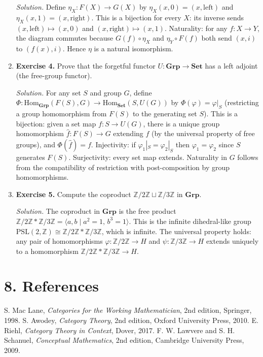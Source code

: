 \begin{enumerate}[leftmargin=*,itemsep=0.9em]
\emph{Solution.} Define $\eta_X:F(X)\to G(X)$ by $\eta_X(x,0)=(x,\text{left})$ and $\eta_X(x,1)=(x,\text{right})$. This is a bijection for every $X$: its inverse sends $(x,\text{left})\mapsto(x,0)$ and $(x,\text{right})\mapsto(x,1)$. Naturality: for any $f:X\to Y$, the diagram commutes because $G(f)\circ\eta_X$ and $\eta_Y\circ F(f)$ both send $(x,i)$ to $(f(x),i)$. Hence $\eta$ is a natural isomorphism.

\item \textbf{Exercise 4.} Prove that the forgetful functor $U:\mathbf{Grp}\to\mathbf{Set}$ has a left adjoint (the free-group functor).

\emph{Solution.} For any set $S$ and group $G$, define $\Phi:\mathrm{Hom}_{\mathbf{Grp}}(F(S),G)\to\mathrm{Hom}_{\mathbf{Set}}(S,U(G))$ by $\Phi(\varphi)=\varphi|_S$ (restricting a group homomorphism from $F(S)$ to the generating set $S$). This is a bijection: given a set map $f:S\to U(G)$, there is a unique group homomorphism $\hat{f}:F(S)\to G$ extending $f$ (by the universal property of free groups), and $\Phi(\hat{f})=f$. Injectivity: if $\varphi_1|_S=\varphi_2|_S$ then $\varphi_1=\varphi_2$ since $S$ generates $F(S)$. Surjectivity: every set map extends. Naturality in $G$ follows from the compatibility of restriction with post-composition by group homomorphisms.

\item \textbf{Exercise 5.} Compute the coproduct $\mathbb{Z}/2\mathbb{Z}\sqcup\mathbb{Z}/3\mathbb{Z}$ in $\mathbf{Grp}$.

\emph{Solution.} The coproduct in $\mathbf{Grp}$ is the free product $\mathbb{Z}/2\mathbb{Z}*\mathbb{Z}/3\mathbb{Z}=\langle a,b\mid a^2=1,\,b^3=1\rangle$. This is the infinite dihedral-like group $\mathrm{PSL}(2,\mathbb{Z})\cong\mathbb{Z}/2\mathbb{Z}*\mathbb{Z}/3\mathbb{Z}$, which is infinite. The universal property holds: any pair of homomorphisms $\varphi:\mathbb{Z}/2\mathbb{Z}\to H$ and $\psi:\mathbb{Z}/3\mathbb{Z}\to H$ extends uniquely to a homomorphism $\mathbb{Z}/2\mathbb{Z}*\mathbb{Z}/3\mathbb{Z}\to H$.

\end{enumerate}
\section*{8. References}
\begin{thebibliography}{99}
 S. Mac Lane, \emph{Categories for the Working Mathematician}, 2nd edition, Springer, 1998.
 S. Awodey, \emph{Category Theory}, 2nd edition, Oxford University Press, 2010.
 E. Riehl, \emph{Category Theory in Context}, Dover, 2017.
 F. W. Lawvere and S. H. Schanuel, \emph{Conceptual Mathematics}, 2nd edition, Cambridge University Press, 2009.
\end{thebibliography}
